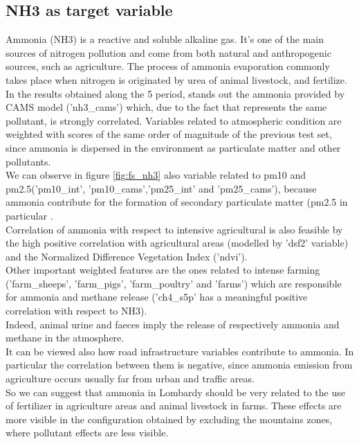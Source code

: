 \subsection{NH3 as target variable}
Ammonia (NH3) is a reactive and soluble alkaline gas. It's one of the main sources of nitrogen pollution and come from both natural and anthropogenic sources, such as agriculture.
The process of ammonia evaporation commonly takes place when nitrogen is originated by urea of animal livestock, and fertilize. \\
In the results obtained along the 5 period, stands out the ammonia provided by CAMS model ('nh3\_cams') which, due to the fact that represents the same pollutant, is strongly correlated. Variables related to atmospheric condition are weighted with scores of the same order of magnitude of the previous test set, since ammonia is dispersed in the environment as particulate matter and other pollutants.\\
We can observe in figure \ref{fig:fs_nh3} also variable related to pm10 and pm2.5('pm10\_int', 'pm10\_cams','pm25\_int' and 'pm25\_cams'), because ammonia contribute for the formation of secondary particulate matter (pm2.5 in particular\cite{zhu2015sources} .\\
Correlation of ammonia with respect to intensive agricultural is also feasible by the high positive correlation with agricultural areas (modelled by 'dsf2' variable) and the Normalized Difference Vegetation Index ('ndvi').\\
Other important weighted features are the ones related to intense farming ('farm\_sheeps', 'farm\_pigs', 'farm\_poultry' and 'farms') which are responsible for ammonia and methane release ('ch4\_s5p' has a meaningful positive correlation with respect to NH3).\\
Indeed, animal urine and faeces imply the release of respectively ammonia and methane in the atmosphere\cite{saggar2004review}.\\
It can be viewed also how road infrastructure variables contribute to ammonia. In particular the correlation between them is negative, since ammonia emission from agriculture occurs usually far from urban and traffic areas.\\
So we can suggest that ammonia in Lombardy should be very related to the use of fertilizer in agriculture areas and animal livestock in farms.
These effects are more visible in the configuration obtained by excluding the mountains zones, where pollutant effects are less visible. 
\bigbreak
\pagebreak
\clearpage
